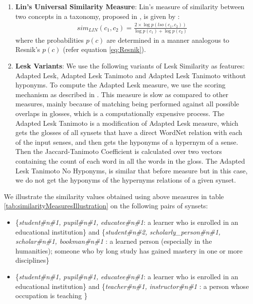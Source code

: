 \begin{enumerate}
\item \textbf{Lin's Universal Similarity Measure}: Lin's measure of similarity between two concepts in a taxonomy, proposed in \citep{Lin:1998}, is given by :
\begin{align}
sim_{LIN}(c_1,c_2) = \frac{2 \times \log p(lso(c_1,c_2))}{\log p(c_1) + \log p(c_2)} \label{eq:Lin}
\end{align}
where the probabilities $p(c)$ are determined in a manner analogous to Resnik's $p(c)$ (refer equation \ref{eq:Resnik}).

\item \textbf{Lesk Variants}: We use the following variants of Lesk Similarity \citep{Lesk:1986} as features: Adapted Lesk, Adapted Lesk Tanimoto and Adapted Lesk Tanimoto without hyponyms. To compute the Adapted Lesk measure, we use the scoring mechanism as described in \citep{Banerjee:2002}. This measure is slow as compared to other measures, mainly because of matching being performed against all possible overlaps in glosses, which is a computationally expensive process. The Adapted Lesk Tanimoto is a modification of Adapted Lesk measure, which gets the glosses of all synsets that have a direct WordNet relation with each of the input senses, and then gets the hyponyms of a hypernym of a sense. Then the Jaccard-Tanimoto Coefficient is calculated over two vectors containing the count of each word in all the words in the gloss. The Adapted Lesk Tanimoto No Hyponyms, is similar that before measure but in this case, we do not get the hyponyms of the hypernyms relations of a given synset.
\end{enumerate}

We illustrate the similarity values obtained using above measures in table \ref{tab:similarityMeasuresIllustration} on the following pairs of synsets: 
\begin{itemize}
\item \{\textit{student\#n\#1, pupil\#n\#1, educatee\#n\#1}: a learner who is enrolled in an educational institution\} and \{\textit{student\#n\#2, scholarly\_person\#n\#1, scholar\#n\#1, bookman\#n\#1} : a learned person (especially in the humanities); someone who by long study has gained mastery in one or more disciplines\}
\item \{\textit{student\#n\#1, pupil\#n\#1, educatee\#n\#1}: a learner who is enrolled in an educational institution\} and \{\textit{teacher\#n\#1, instructor\#n\#1} : a person whose occupation is teaching \}
\end{itemize}

